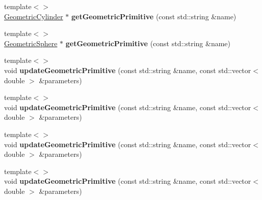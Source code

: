 \begin{DoxyCompactItemize}
\item 
\hypertarget{classhiqp_1_1geometric__primitives_1_1GeometricPrimitiveMap_ae728aa00516f80aaf850359a548b6473}{{\footnotesize template$<$$>$ }\\\hyperlink{classhiqp_1_1geometric__primitives_1_1GeometricCylinder}{Geometric\-Cylinder} $\ast$ {\bfseries get\-Geometric\-Primitive} (const std\-::string \&name)}\label{classhiqp_1_1geometric__primitives_1_1GeometricPrimitiveMap_ae728aa00516f80aaf850359a548b6473}

\item 
\hypertarget{classhiqp_1_1geometric__primitives_1_1GeometricPrimitiveMap_a71bba5bd417ee2a5ae8179aabc10cf79}{{\footnotesize template$<$$>$ }\\\hyperlink{classhiqp_1_1geometric__primitives_1_1GeometricSphere}{Geometric\-Sphere} $\ast$ {\bfseries get\-Geometric\-Primitive} (const std\-::string \&name)}\label{classhiqp_1_1geometric__primitives_1_1GeometricPrimitiveMap_a71bba5bd417ee2a5ae8179aabc10cf79}

\item 
\hypertarget{classhiqp_1_1geometric__primitives_1_1GeometricPrimitiveMap_afede16f63460bb07795ee12b426ee919}{{\footnotesize template$<$$>$ }\\void {\bfseries update\-Geometric\-Primitive} (const std\-::string \&name, const std\-::vector$<$ double $>$ \&parameters)}\label{classhiqp_1_1geometric__primitives_1_1GeometricPrimitiveMap_afede16f63460bb07795ee12b426ee919}

\item 
\hypertarget{classhiqp_1_1geometric__primitives_1_1GeometricPrimitiveMap_afede16f63460bb07795ee12b426ee919}{{\footnotesize template$<$$>$ }\\void {\bfseries update\-Geometric\-Primitive} (const std\-::string \&name, const std\-::vector$<$ double $>$ \&parameters)}\label{classhiqp_1_1geometric__primitives_1_1GeometricPrimitiveMap_afede16f63460bb07795ee12b426ee919}

\item 
\hypertarget{classhiqp_1_1geometric__primitives_1_1GeometricPrimitiveMap_afede16f63460bb07795ee12b426ee919}{{\footnotesize template$<$$>$ }\\void {\bfseries update\-Geometric\-Primitive} (const std\-::string \&name, const std\-::vector$<$ double $>$ \&parameters)}\label{classhiqp_1_1geometric__primitives_1_1GeometricPrimitiveMap_afede16f63460bb07795ee12b426ee919}

\item 
\hypertarget{classhiqp_1_1geometric__primitives_1_1GeometricPrimitiveMap_afede16f63460bb07795ee12b426ee919}{{\footnotesize template$<$$>$ }\\void {\bfseries update\-Geometric\-Primitive} (const std\-::string \&name, const std\-::vector$<$ double $>$ \&parameters)}\label{classhiqp_1_1geometric__primitives_1_1GeometricPrimitiveMap_afede16f63460bb07795ee12b426ee919}


\end{DoxyCompactItemize}
